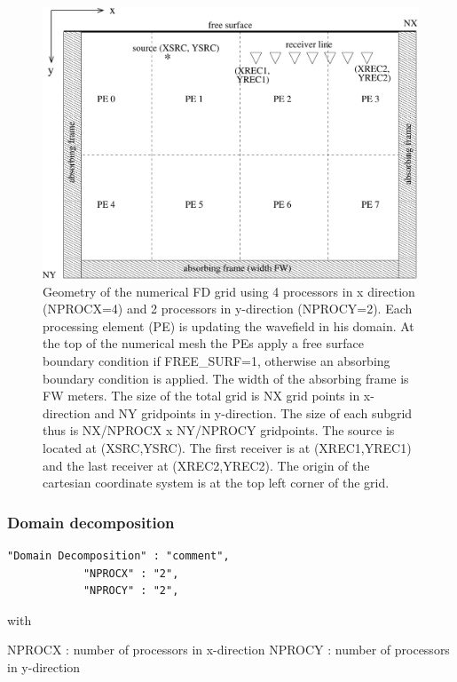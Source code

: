 \documentclass[11pt,onecolumn,oneside]{article}
\begin{document}
\begin{figure}
\begin{center}
\includegraphics[width=15cm,angle=0]{figures/grid.pdf}
\end{center}
\caption{Geometry of the numerical FD grid using 4 processors in x direction (NPROCX=4) and 2 processors in y-direction (NPROCY=2). Each processing element (PE) is updating the wavefield in his domain.
At the top of the numerical mesh the PEs apply a free surface boundary condition if FREE\_SURF=1, otherwise an absorbing boundary condition is applied. The width of the absorbing frame is FW meters. The size of the total grid is NX grid points in x-direction and NY gridpoints in y-direction. The size of each subgrid thus is NX/NPROCX x NY/NPROCY gridpoints. The source is located at (XSRC,YSRC). The first receiver is at (XREC1,YREC1) and the last receiver at (XREC2,YREC2). The origin of the cartesian coordinate system is at the top left corner of the grid. }
\label{fig_grid}
\end{figure}
\newpage
\subsubsection{Domain decomposition}

\begin{verbatim}
"Domain Decomposition" : "comment",
			"NPROCX" : "2",
			"NPROCY" : "2",
\end{verbatim}

with

NPROCX : number of processors in x-direction \newline
NPROCY : number of processors in y-direction
\end{document}
